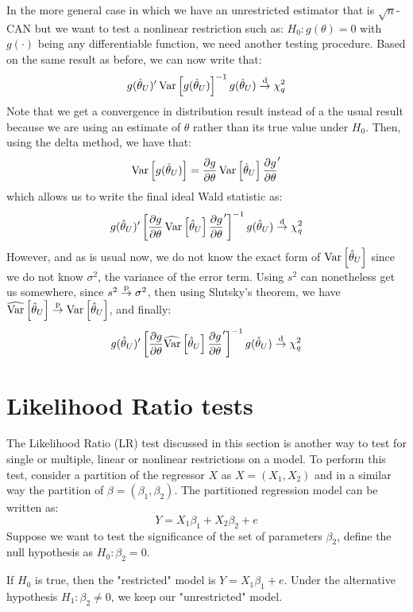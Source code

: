 In the more general case in which we have an unrestricted estimator that is $\sqrt{n}$-CAN but we want to test a nonlinear restriction such as: $H_0: g(\theta) = 0$ with $g(\cdot)$ being any differentiable function, we need another testing procedure. Based on the same result as before, we can now write that: $$ g(\hat\theta_U)'\operatorname{Var}\left[g(\hat\theta_U)\right]^{-1}g(\hat\theta_U) \overset{\text{d}}{\to} \chi_q^2 $$ Note that we get a convergence in distribution result instead of a the usual result because we are using an estimate of $\theta$ rather than its true value under $H_0$. Then, using the delta method, we have that:\begin{align*}
\operatorname{Var}\left[g(\hat\theta_U)\right] = \frac{\partial g}{\partial \theta}\operatorname{Var}\left[\hat\theta_U\right]\frac{\partial g}{\partial \theta}'
\end{align*}
which allows us to write the final ideal Wald statistic as: $$ g(\hat\theta_U)' \left[\frac{\partial g}{\partial \theta}\operatorname{Var}\left[\hat\theta_U\right]\frac{\partial g}{\partial \theta}'\right]^{-1} g(\hat\theta_U) \overset{\text{d}}{\to} \chi_q^2 $$
However, and as is usual now, we do not know the exact form of $\operatorname{Var}\left[\hat\theta_U\right]$ since we do not know $\sigma^2$, the variance of the error term. Using $s^2$ can nonetheless get us somewhere, since $s^2 \overset{\text{p}}{\to} \sigma^2$, then using Slutsky's theorem, we have $\widehat{\operatorname{Var}}\left[\hat\theta_U\right] \overset{\text{p}}{\to} \operatorname{Var}\left[\hat\theta_U\right]$, and finally: $$ g(\hat\theta_U)' \left[\frac{\partial g}{\partial \theta}\widehat{\operatorname{Var}}\left[\hat\theta_U\right]\frac{\partial g}{\partial \theta}'\right]^{-1} g(\hat\theta_U) \overset{\text{d}}{\to} \chi_q^2 $$

\section{Likelihood Ratio tests}

The Likelihood Ratio (LR) test discussed in this section is another way to test for single or multiple, linear or nonlinear restrictions on a model. To perform this test, consider a partition of the regressor $X$ as $X = (X_1, X_2)$ and in a similar way the partition of $\beta = (\beta_1, \beta_2)$. The partitioned regression model can be written as: $$ Y = X_1\beta_1 + X_2\beta_2 + e $$ Suppose we want to test the significance of the set of parameters $\beta_2$, define the null hypothesis as $H_0 : \beta_2 = 0$.

If $H_0$ is true, then the "restricted" model is $Y = X_1\beta_1 + e$. Under the alternative hypothesis $H_1:\beta_2 \neq 0$, we keep our "unrestricted" model.

